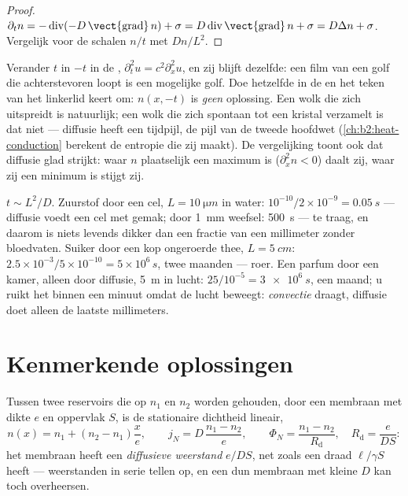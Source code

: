 \begin{proof}
$\partial_t n = -\operatorname{div}(-D\,\vect{\operatorname{grad}}\,n) +
\sigma = D\operatorname{div}\vect{\operatorname{grad}}\,n + \sigma = D\Delta
n + \sigma$.
Vergelijk voor de schalen $n/t$ met $Dn/L^2$.
\end{proof}

\begin{remark}\label{rem:b2:particle-diffusion:irreversible}
Verander $t$ in $-t$ in de ,
$\partial_t^2 u = c^2
\partial_x^2 u$, en zij blijft dezelfde: een film van
een golf die achterstevoren loopt is
een mogelijke golf. Doe hetzelfde in de  en het teken van
het linkerlid keert om: $n(x,-t)$ is \emph{geen} oplossing. Een wolk die
zich uitspreidt is natuurlijk; een wolk die zich spontaan tot een kristal verzamelt
is dat niet --- diffusie heeft een tijdpijl, de pijl van de tweede hoofdwet
(\cref{ch:b2:heat-conduction} berekent de entropie die zij maakt). De
vergelijking toont ook dat diffusie glad strijkt: waar $n$ plaatselijk een
maximum is ($\partial_x^2 n < 0$) daalt zij, waar zij een minimum is
stijgt zij.
\end{remark}

\begin{example}\label{ex:b2:particle-diffusion:times}
$t \sim L^2/D$. Zuurstof door een cel, $L = \qty{10}{\micro m}$ in water:
$10^{-10}/2 \times 10^{-9} = \qty{0.05}{s}$ --- diffusie voedt een cel met
gemak; door \qty{1}{mm} weefsel: \qty{500}{s} --- te traag, en daarom
is niets levends dikker dan een fractie van een millimeter zonder
bloedvaten. Suiker door een kop ongeroerde thee, $L = \qty{5}{cm}$:
$2.5 \times 10^{-3}/5 \times 10^{-10} = 5 \times 10^6\,\unit{s}$, twee maanden
--- roer. Een parfum door een kamer, alleen door diffusie, \qty{5}{m} in
lucht: $25/10^{-5} = \qty{3e6}{s}$, een maand; u ruikt het binnen een minuut
omdat de lucht beweegt: \emph{convectie} draagt, diffusie doet alleen
de laatste millimeters.
\end{example}

\section{Kenmerkende oplossingen}

\begin{proposition}\label{prop:b2:particle-diffusion:membrane}
Tussen twee reservoirs die op $n_1$ en $n_2$ worden gehouden, door een membraan met
dikte $e$ en oppervlak $S$, is de stationaire dichtheid lineair,
\[
n(x) = n_1 + (n_2 - n_1)\frac{x}{e}, \qquad
j_N = D\,\frac{n_1 - n_2}{e}, \qquad
\Phi_N = \frac{n_1 - n_2}{R_{\text{d}}}, \quad R_{\text{d}} = \frac{e}{DS}:
\]
het membraan heeft een \emph{diffusieve weerstand} $e/DS$, net zoals een draad
$\ell/\gamma S$ heeft --- weerstanden in serie tellen op, en een dun membraan
met kleine $D$ kan toch overheersen.
\end{proposition}

